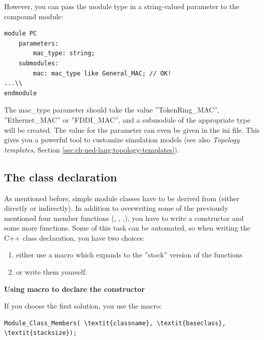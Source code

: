 However, you can pass the module type in a string-valued parameter to
the compound module:

\begin{Verbatim}
module PC
    parameters:
        mac_type: string;
    submodules:
        mac: mac_type like General_MAC; // OK!
...\\
endmodule
\end{Verbatim}

\begin{sloppypar}
The mac\_type parameter should take the value ''TokenRing\_MAC'',
''Ethernet\_MAC'' or ''FDDI\_MAC'', and a submodule of the appropriate
type will be created. The value for the parameter can even be given in
the ini file. This gives you a powerful tool to customize simulation
models (see also \textit{Topology templates}, Section
\ref{sec:ch-ned-lang:topology-templates}).
\end{sloppypar}




\subsection{The class declaration}

As mentioned before, simple module classes have
to be derived from  (either directly or
indirectly). In addition to overwriting some of the previously
mentioned four member functions (,
, ,), you
have to write a constructor and some more
functions. Some of this task can be automated, so when writing the C++
class declaration, you have two choices:
\begin{enumerate}
\item{either use a macro which expands to the ''stock'' version of the
    functions}
\item{or write them yourself.}
\end{enumerate}

\textbf{Using macro to declare the constructor}

If you choose the first solution, you use the
 macro:

\begin{Verbatim}[commandchars=\\\{\}]
Module_Class_Members( \textit{classname}, \textit{baseclass}, \textit{stacksize});
\end{Verbatim}


